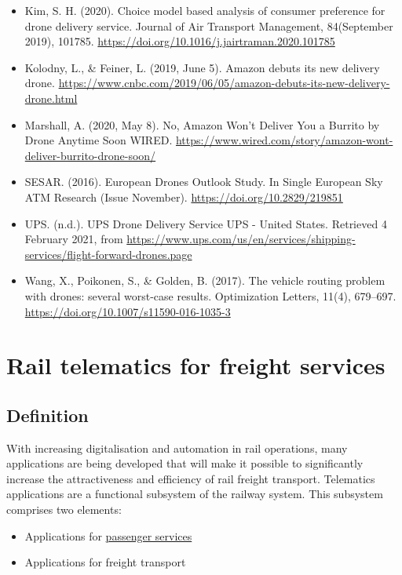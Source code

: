 \documentclass[
]{book}
\providecommand{\tightlist}{%
  \setlength{\itemsep}{0pt}\setlength{\parskip}{0pt}}
\begin{document}
\begin{itemize}
\item
  Kim, S. H. (2020). Choice model based analysis of consumer preference for drone delivery service. Journal of Air Transport Management, 84(September 2019), 101785. \url{https://doi.org/10.1016/j.jairtraman.2020.101785}
\item
  Kolodny, L., \& Feiner, L. (2019, June 5). Amazon debuts its new delivery drone. \url{https://www.cnbc.com/2019/06/05/amazon-debuts-its-new-delivery-drone.html}
\item
  Marshall, A. (2020, May 8). No, Amazon Won't Deliver You a Burrito by Drone Anytime Soon \textbar{} WIRED. \url{https://www.wired.com/story/amazon-wont-deliver-burrito-drone-soon/}
\item
  SESAR. (2016). European Drones Outlook Study. In Single European Sky ATM Research (Issue November). \url{https://doi.org/10.2829/219851}
\item
  UPS. (n.d.). UPS Drone Delivery Service \textbar{} UPS - United States. Retrieved 4 February 2021, from \url{https://www.ups.com/us/en/services/shipping-services/flight-forward-drones.page}
\item
  Wang, X., Poikonen, S., \& Golden, B. (2017). The vehicle routing problem with drones: several worst-case results. Optimization Letters, 11(4), 679--697. \url{https://doi.org/10.1007/s11590-016-1035-3}
\end{itemize}

\hypertarget{rail_telematics_freight}{%
\section{Rail telematics for freight services}\label{rail_telematics_freight}}

\hypertarget{definition-26}{%
\subsection*{Definition}\label{definition-26}}

With increasing digitalisation and automation in rail operations, many applications are being developed that will make it possible to significantly increase the attractiveness and efficiency of rail freight transport. Telematics applications are a functional subsystem of the railway system. This subsystem comprises two elements:

\begin{itemize}
\tightlist
\item
  Applications for \protect\hyperlink{telematics_passenger}{passenger services}
\item
  Applications for freight transport
\end{itemize}
\end{document}
